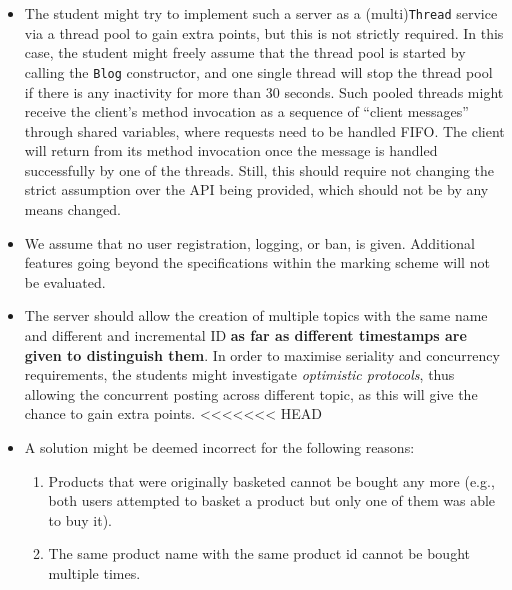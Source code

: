 \documentclass{article}
\begin{document}
\begin{itemize}
 \item The student might try to implement such a server as a (multi)\texttt{Thread} service via a thread pool to gain extra points, but this is not strictly required. In this case, the student might freely assume that the thread pool is started  by calling the \texttt{Blog} constructor, and one single thread will stop the thread pool if there is any inactivity for more than 30 seconds. Such pooled threads might receive the client's method invocation as a sequence of ``client messages'' through shared
		variables, where requests need to be handled FIFO. The client will return from its method invocation once the message is handled successfully by one of the threads.
Still, this should require not changing the strict assumption over the API being provided, which should not be by any means changed.
		\item We assume that no user registration, logging, or ban, is given. Additional features going beyond the specifications within the marking scheme will not be evaluated. 
		\item The server should allow the creation of multiple topics with the same name and different and incremental ID \textbf{as far as different timestamps are given to distinguish them}. In order to maximise seriality and concurrency requirements, the students might investigate \textit{optimistic protocols}, thus allowing the concurrent posting across different topic, as this will give the chance to gain extra points.
<<<<<<< HEAD
		\item A solution might be deemed incorrect for the following reasons:
		\begin{enumerate}
		\item Products that were originally basketed cannot be bought any more (e.g., both users attempted to basket a product but only one of them was able to buy it).
	\item The same product name with the same product id cannot be bought multiple times.


\end{enumerate}
\end{itemize}
\end{document}
